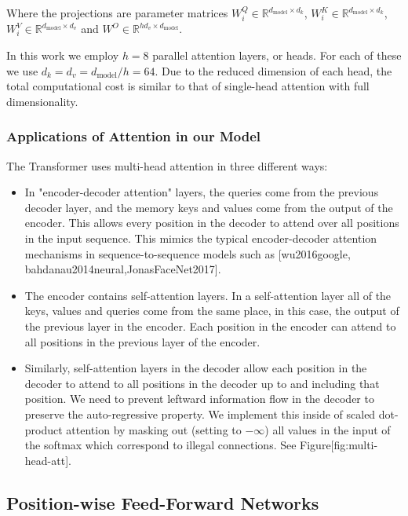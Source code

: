 \documentclass[11pt,a4paper]{article}
\begin{document}
Where the projections are parameter matrices $W^Q_i \in \mathbb{R}^{d_{\text{model}} \times d_k}$, $W^K_i \in \mathbb{R}^{d_{\text{model}} \times d_k}$, $W^V_i \in \mathbb{R}^{d_{\text{model}} \times d_v}$ and $W^O \in \mathbb{R}^{hd_v \times d_{\text{model}}}$.

In this work we employ $h=8$ parallel attention layers, or heads. For each of these we use $d_k=d_v=d_{\text{model}}/h=64$. Due to the reduced dimension of each head, the total computational cost is similar to that of single-head attention with full dimensionality.

\subsubsection{Applications of Attention in our Model}

The Transformer uses multi-head attention in three different ways:

\begin{itemize}
\item In "encoder-decoder attention" layers, the queries come from the previous decoder layer, and the memory keys and values come from the output of the encoder.   This allows every position in the decoder to attend over all positions in the input sequence.  This mimics the typical encoder-decoder attention mechanisms in sequence-to-sequence models such as [wu2016google, bahdanau2014neural,JonasFaceNet2017].
\item The encoder contains self-attention layers.  In a self-attention layer all of the keys, values and queries come from the same place, in this case, the output of the previous layer in the encoder.   Each position in the encoder can attend to all positions in the previous layer of the encoder.
\item Similarly, self-attention layers in the decoder allow each position in the decoder to attend to all positions in the decoder up to and including that position.  We need to prevent leftward information flow in the decoder to preserve the auto-regressive property.  We implement this inside of scaled dot-product attention by masking out (setting to $-\infty$) all values in the input of the softmax which correspond to illegal connections.  See Figure[fig:multi-head-att].
\end{itemize}

\subsection{Position-wise Feed-Forward Networks}
\end{document}

